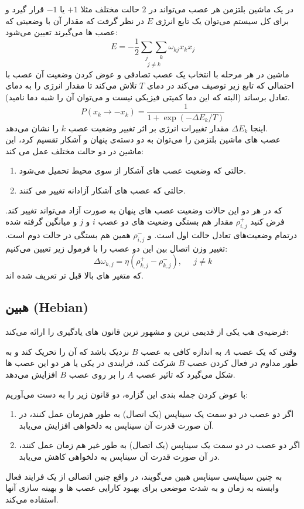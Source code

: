 \documentclass[11pt,a4paper,twocolumn]{article}
\begin{document}
در یک ماشین بلتزمن هر عصب می‌تواند در $2$ حالت مختلف مثلا $+1$ یا $-1$ قرار گیرد و برای کل سیستم می‌توان یک تابع انرژی $E$ در نظر گرفت که مقدار آن با وضعیتی که عصب ها می‌گیرند تعیین می‌شود:
$$E=-\frac{1}{2} \underset{j \neq k}{\underset{j}{\sum} \underset{k}{\sum}} \omega_{kj} x_k x_j$$
ماشین در هر مرحله با انتخاب یک عصب تصادفی و عوض کردن وضعیت آن عصب با احتمالی که تابع زیر توصیف می‌کند در دمای $T$ تلاش می‌کند تا مقدار انرژی را به دمای تعادل برساند (البته که این دما کمیتی فیزیکی  نیست و می‌توان آن را شبه دما نامید).
$$P(x_k \rightarrow -x_k) = \frac{1}{1+\exp{(-\Delta E_k / T) }}$$
اینجا $\Delta E_k$ مقدار تغییرات انرژی بر اثر تغییر وضعیت عصب $k$ را نشان می‌دهد.\\
عصب های ماشین بلتزمن را می‌توان به دو دسته‌ی پنهان و آشکار تقسیم کرد، این ماشین در دو حالت مختلف عمل می کند:
\begin{enumerate}
\item
حالتی  که وضعیت عصب های آشکار از سوی محیط تحمیل می‌شود.
\item
حالتی که عصب های آشکار آزادانه تغییر می کنند.
\end{enumerate}
که در هر دو این حالات وضعیت عصب های پنهان به صورت آزاد می‌تواند تغییر کند. فرض کنید $\rho_{i,j}^{+}$ مقدار هم بستگی وضعیت های دو عصب $i$ و $j$  و میانگین گرفته شده درتمام وضعیت‌های تعادل حالت اول است. و $\rho_{i,j}^{-}$ همین هم بستگی در حالت دوم است. تغییر وزن اتصال بین این دو عصب را با فرمول زیر تعیین می‌کنیم:
$$\Delta \omega_{k,j} = \eta(\rho_{k,j}^{+} - \rho_{k,j}^{-}), \;\;\;\;\; j \neq k$$
که متغیر های بالا قبل تر تعریف شده اند. 
\subsection{هبین (Hebian)}
فرضیه‌ی هب یکی از قدیمی ترین و مشهور ترین قانون های یادگیری را ارائه می‌کند:

وقتی که یک عصب $A$ به اندازه کافی به عصب $B$ نزدیک باشد که آن را تحریک کند و به طور مداوم در فعال کردن عصب $B$ شرکت کند، فرایندی در یکی یا هر دو این عصب ها شکل می‌گیرد که تاثیر عصب $A$ را بر روی عصب $B$ افزایش می‌دهد. \cite[ص-۵۱]{haykin}

با عوض کردن جمله بندی این گزاره، دو قانون زیر را به دست می‌آوریم:
\begin{enumerate}
\item
اگر دو عصب در دو سمت یک سیناپس (یک اتصال) به طور هم‌زمان عمل کنند، در آن صورت قدرت آن سیناپس به دلخواهی افزایش می‌یابد.
\item
اگر دو عصب در دو سمت یک سیناپس (یک اتصال) به طور غیر هم زمان عمل کنند، در آن صورت قدرت آن سیناپس به دلخواهی کاهش می‌یابد. \cite[ص-۵۵]{haykin}
\end{enumerate}
به چنین سیناپسی سیناپس هبین می‌گویند، در واقع چنین اتصالی از یک فرایند فعال وابسته به زمان و به شدت موضعی برای بهبود کارایی عصب ها و بهینه سازی آنها استفاده می‌کند.
\end{document}
